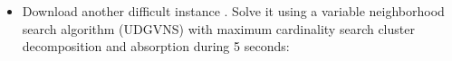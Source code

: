 \documentclass[letterpaper,10pt,openany,oneside,english]{sphinxmanual}
\begin{document}
\begin{itemize}
\begin{sphinxVerbatim}[commandchars=\\\{\}]
   
\end{sphinxVerbatim}

\item {} 
\sphinxAtStartPar
Download another difficult instance . Solve it using a variable neighborhood search algorithm (UDGVNS) with maximum cardinality search cluster decomposition and absorption  during 5 seconds:

\begin{sphinxVerbatim}[commandchars=\\\{\}]
     
\end{sphinxVerbatim}


\end{itemize}
\end{document}
